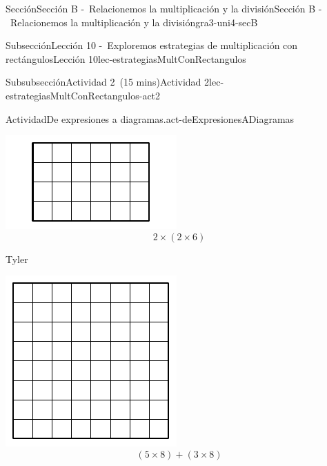 \documentclass[oneside,10pt,]{article}
\begin{document}
\begin{sectionptx}{Sección}{Sección B -~Relacionemos la multiplicación y la división}{}{Sección B -~Relacionemos la multiplicación y la división}{}{}{gra3-uni4-secB}
\begin{subsectionptx}{Subsección}{Lección 10 -~Exploremos estrategias de multiplicación con rectángulos}{}{Lección 10}{}{}{lec-estrategiasMultConRectangulos}
\begin{subsubsectionptx}{Subsubsección}{Actividad 2~(15 mins)}{}{Actividad 2}{}{}{lec-estrategiasMultConRectangulos-act2}
\begin{activity}{Actividad}{De expresiones a diagramas.}{act-deExpresionesADiagramas}
\begin{sidebyside}{3}{0.0166666666666667}{0.0166666666666667}{0.0333333333333333}
\begin{sbspanel}{0.3}
\includegraphics[width=\linewidth]{external/svg-source/tikz-file-153053.pdf}
%
\begin{equation*}
2 \times (2 \times 6)
\end{equation*}
%
\end{sbspanel}%
\begin{sbspanel}{0.3}%
Tyler%
\par
\includegraphics[width=\linewidth]{external/svg-source/tikz-file-153054.pdf}
%
\begin{equation*}
(5 \times 8) + (3 \times 8)
\end{equation*}
%
\end{sbspanel}%
\end{sidebyside}%

\end{activity}
\end{subsubsectionptx}
\end{subsectionptx}
\end{sectionptx}
\end{document}
